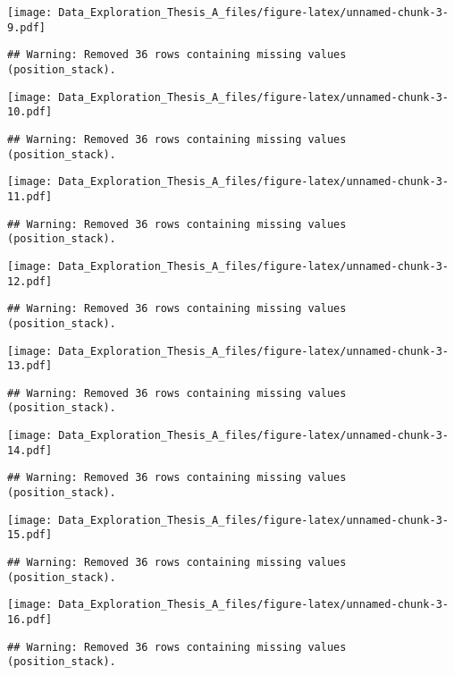\documentclass[]{article}
\begin{document}
\texttt{[image: Data\_Exploration\_Thesis\_A\_files/figure-latex/unnamed-chunk-3-9.pdf]}

\begin{verbatim}
## Warning: Removed 36 rows containing missing values (position_stack).
\end{verbatim}

\texttt{[image: Data\_Exploration\_Thesis\_A\_files/figure-latex/unnamed-chunk-3-10.pdf]}

\begin{verbatim}
## Warning: Removed 36 rows containing missing values (position_stack).
\end{verbatim}

\texttt{[image: Data\_Exploration\_Thesis\_A\_files/figure-latex/unnamed-chunk-3-11.pdf]}

\begin{verbatim}
## Warning: Removed 36 rows containing missing values (position_stack).
\end{verbatim}

\texttt{[image: Data\_Exploration\_Thesis\_A\_files/figure-latex/unnamed-chunk-3-12.pdf]}

\begin{verbatim}
## Warning: Removed 36 rows containing missing values (position_stack).
\end{verbatim}

\texttt{[image: Data\_Exploration\_Thesis\_A\_files/figure-latex/unnamed-chunk-3-13.pdf]}

\begin{verbatim}
## Warning: Removed 36 rows containing missing values (position_stack).
\end{verbatim}

\texttt{[image: Data\_Exploration\_Thesis\_A\_files/figure-latex/unnamed-chunk-3-14.pdf]}

\begin{verbatim}
## Warning: Removed 36 rows containing missing values (position_stack).
\end{verbatim}

\texttt{[image: Data\_Exploration\_Thesis\_A\_files/figure-latex/unnamed-chunk-3-15.pdf]}

\begin{verbatim}
## Warning: Removed 36 rows containing missing values (position_stack).
\end{verbatim}

\texttt{[image: Data\_Exploration\_Thesis\_A\_files/figure-latex/unnamed-chunk-3-16.pdf]}

\begin{verbatim}
## Warning: Removed 36 rows containing missing values (position_stack).
\end{verbatim}
\end{document}
